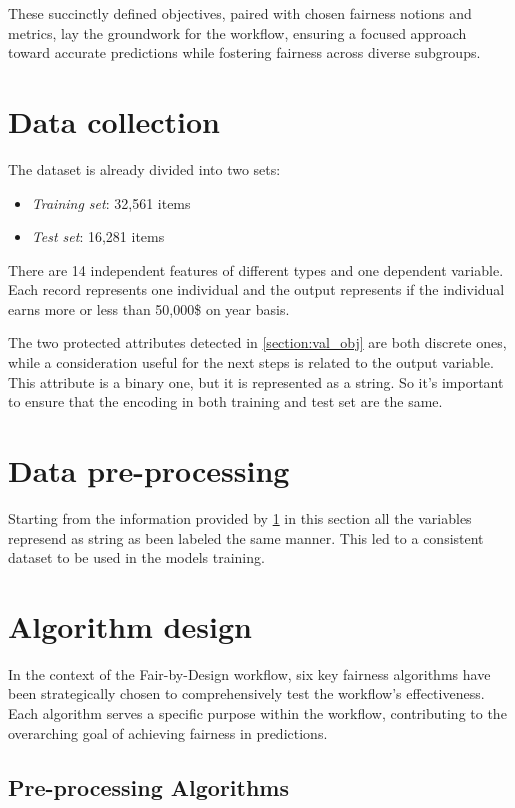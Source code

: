 These succinctly defined objectives, paired with chosen fairness notions and metrics, lay the groundwork for the  workflow, ensuring a focused approach toward accurate predictions while fostering fairness across diverse subgroups.

\section{Data collection}
\label{section:val_dc}

The dataset is already divided into two sets:
\begin{itemize}
    \item \emph{Training set}: 32,561 items
    \item \emph{Test set}: 16,281 items
\end{itemize}

There are 14 independent features of different types and one dependent variable. Each record represents one individual and the output represents if the individual earns more or less than 50,000\$ on year basis.

The two protected attributes detected in \cref{section:val_obj} are both discrete ones, while a consideration useful for the next steps is related to the output variable. This attribute is a binary one, but it is represented as a string. So it's important to ensure that the encoding in both training and test set are the same.

\section{Data pre-processing}

Starting from the information provided by \cref{section:val_dc} in this section all the variables represend as string as been labeled the same manner. This led to a consistent dataset to be used in the models training.

\section{Algorithm design}
\label{section:val_alg}

In the context of the Fair-by-Design workflow, six key fairness algorithms have been strategically chosen to comprehensively test the workflow's effectiveness. Each algorithm serves a specific purpose within the workflow, contributing to the overarching goal of achieving fairness in predictions.

\subsection{Pre-processing Algorithms}

